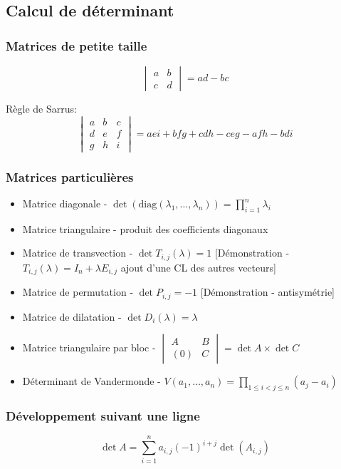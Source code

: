 \documentclass[openany]{book}
\begin{document}
\subsection{Calcul de déterminant}
\subsubsection{Matrices de petite taille}

\[ \begin{vmatrix}
a & b\\
c & d
\end{vmatrix} = ad - bc \]

Règle de Sarrus:
\[ \begin{vmatrix}
a & b & c\\
d & e & f\\
g & h & i
\end{vmatrix} = aei + bfg + cdh - ceg - afh - bdi \]

\subsubsection{Matrices particulières}
\begin{itemize}
    \item Matrice diagonale - $\det (\text{diag} (\lambda_1,\dots,\lambda_n)) = \prod_{i=1}^{n} \lambda_i$
    \item Matrice triangulaire - produit des coefficients diagonaux
    \item Matrice de transvection - $\det T_{i, j}(\lambda) = 1$ [Démonstration - $T_{i, j}(\lambda) = I_n + \lambda E_{i, j}$ ajout d'une CL des autres vecteurs]
    \item Matrice de permutation - $\det P_{i, j} = -1$ [Démonstration - antisymétrie]
    \item Matrice de dilatation - $\det D_{i}(\lambda) = \lambda$
    \item Matrice triangulaire par bloc - $ \begin{vmatrix}
        A & B \\
        (0) & C
    \end{vmatrix} = \det A \times \det C $
    \item Déterminant de Vandermonde - $V(a_1,\dots, a_n) = \prod_{1 \leq i < j \leq n} (a_j - a_i)$
\end{itemize}


\subsubsection{Développement suivant une ligne}
\[ \det A = \sum_{i=1}^{n} a_{i, j}(-1)^{i+j} \det (A_{i, j}) \]
\end{document}
